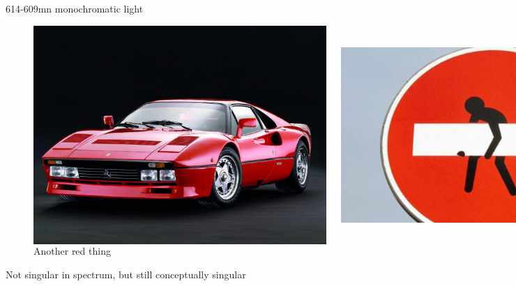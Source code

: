 \documentclass[xcolor=dvipsnames]{beamer}
\begin{document}
\begin{frame}{614-609mn monochromatic light}
\begin{figure}
  \centering
  \begin{columns}
    \centering
    \caption {A red thing}
    \includegraphics[width=0.99\textwidth]{ferrari}
    \centering
    \caption {Another red thing}
    \includegraphics[width=0.99\textwidth]{red_sign}
  \end{columns}
\end{figure}
Not singular in spectrum, but still conceptually singular
\end{frame}
\end{document}
